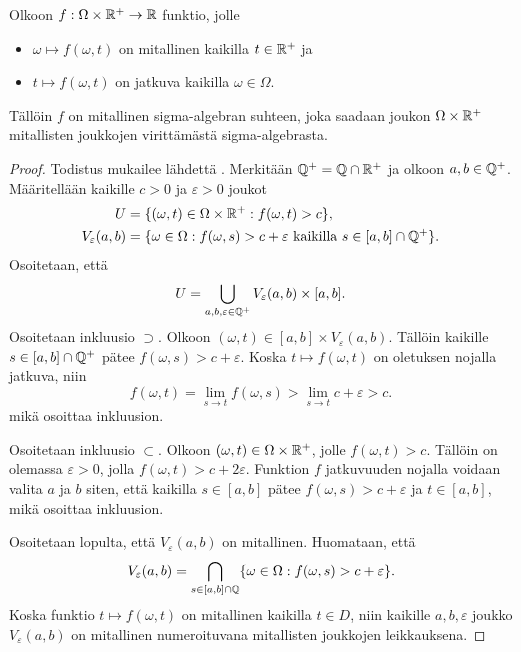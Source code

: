\documentclass[12pt,oneside,a4paper]{amsbook} %
\begin{document}
\begin{lemma}\label{le:caratheodoryIsMeasurable}
    Olkoon $f:\Omega \times {\mathbb{R}^{+}} \to \mathbb{R}$ funktio, jolle
    \begin{itemize}
        \item $\omega \mapsto f(\omega, t)$  on mitallinen kaikilla $t \in {\mathbb{R}^{+}}$ ja
        \item $t \mapsto f(\omega, t)$ on jatkuva kaikilla $\omega \in \Omega$.
    \end{itemize}
    Tällöin $f$ on mitallinen sigma-algebran suhteen, joka saadaan joukon $\Omega \times {\mathbb{R}^{+}}$ mitallisten joukkojen virittämästä sigma-algebrasta.
\end{lemma}
\begin{proof}
    Todistus mukailee lähdettä \cite[s. 28]{optimal}.
    Merkitään $\mathbb{Q}^{+} = \mathbb{Q} \cap {\mathbb{R}^{+}}$ ja olkoon $a, b \in \mathbb{Q}^{+}$. Määritellään kaikille $c > 0$ ja $\varepsilon > 0$ joukot 
    \begin{align*}
        U &= \{(\omega, t) \in \Omega\times {\mathbb{R}^{+}} : f(\omega, t) > c\}, \\
        V_\varepsilon(a, b) &= \{\omega \in \Omega : f(\omega, s) > c + \varepsilon \text{ kaikilla } s \in [a,b]\cap \mathbb{Q}^{+}\}.
    \end{align*}
Osoitetaan, että
\begin{equation*}
    U = \bigcup_{a, b, \varepsilon \in \mathbb{Q}^{+}} V_\varepsilon(a,b) \times [a,b].
\end{equation*}
Osoitetaan inkluusio $\supset$. Olkoon $(\omega, t) \in [a, b] \times V_\varepsilon(a, b)$. Tällöin kaikille $s\in [a, b] \cap \mathbb{Q}^{+}$ pätee $f(\omega, s) > c + \varepsilon$. Koska $t \mapsto f(\omega, t)$ on oletuksen nojalla jatkuva, niin 
    \begin{equation*}
        f(\omega, t) = \lim_{s\to t} f(\omega, s) > \lim_{s\to t} c + \varepsilon > c.
    \end{equation*}
mikä osoittaa inkluusion. 

Osoitetaan inkluusio $\subset$. Olkoon $(\omega, t) \in \Omega \times {\mathbb{R}^{+}} $, jolle $f(\omega, t) > c$. Tällöin on olemassa $\varepsilon > 0$, jolla $f(\omega, t) > c + 2\varepsilon$. Funktion $f$ jatkuvuuden nojalla voidaan valita $a$ ja $b$ siten, että kaikilla $s \in [a, b]$ pätee $f(\omega, s) > c + \varepsilon$ ja $t\in [a,b]$, mikä osoittaa inkluusion.

Osoitetaan lopulta, että $V_\varepsilon(a,b)$ on mitallinen. Huomataan, että
\begin{equation*}
    V_\varepsilon(a,b) = \bigcap_{s \in [a,b]\cap \mathbb{Q}}\{\omega \in \Omega : f(\omega, s) > c + \varepsilon\}.
\end{equation*}
Koska funktio $t \mapsto f(\omega, t)$ on mitallinen kaikilla $t \in D$, niin kaikille $a, b, \varepsilon$ joukko $V_\varepsilon(a, b)$ on mitallinen numeroituvana mitallisten joukkojen leikkauksena.
\end{proof}
\end{document}
